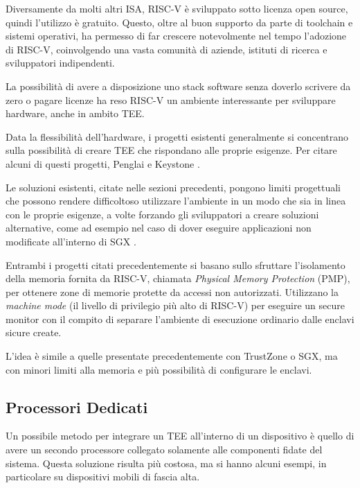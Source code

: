 \documentclass[12pt,italian]{report}
\begin{document}
	Diversamente da molti altri ISA, RISC-V è sviluppato sotto licenza open source, quindi l'utilizzo è gratuito. Questo, oltre al buon supporto da parte di toolchain e sistemi operativi, ha permesso di far crescere notevolmente nel tempo l'adozione di RISC-V, coinvolgendo una vasta comunità di aziende, istituti di ricerca e sviluppatori indipendenti. 
	
	La possibilità di avere a disposizione uno stack software senza doverlo scrivere da zero o pagare licenze ha reso RISC-V un ambiente interessante per sviluppare hardware, anche in ambito TEE.
	
	\bigbreak
	
	Data la flessibilità dell'hardware, i progetti esistenti generalmente si concentrano sulla possibilità di creare TEE che rispondano alle proprie esigenze. Per citare alcuni di questi progetti, Penglai \cite{penglai} e Keystone \cite{keystone}. 
	
	Le soluzioni esistenti, citate nelle sezioni precedenti, pongono limiti progettuali che possono rendere difficoltoso utilizzare l'ambiente in un modo che sia in linea con le proprie esigenze, a volte forzando gli sviluppatori a creare soluzioni alternative, come ad esempio nel caso di dover eseguire applicazioni non modificate all'interno di SGX \cite{grapheneSGX}.
	
	Entrambi i progetti citati precedentemente si basano sullo sfruttare l'isolamento della memoria fornita da RISC-V, chiamata \textit{Physical Memory Protection} (PMP), per ottenere zone di memorie protette da accessi non autorizzati. Utilizzano la \textit{machine mode} (il livello di privilegio più alto di RISC-V) per eseguire un secure monitor con il compito di separare l'ambiente di esecuzione ordinario dalle enclavi sicure create.
	
	L'idea è simile a quelle presentate precedentemente con TrustZone o SGX, ma con minori limiti alla memoria e più possibilità di configurare le enclavi.
	
	\subsection{Processori Dedicati}
	\label{subsec:altri-rpc}
	Un possibile metodo per integrare un TEE all'interno di un dispositivo è quello di avere un secondo processore collegato solamente alle componenti fidate del sistema. Questa soluzione risulta più costosa, ma si hanno alcuni esempi, in particolare su dispositivi mobili di fascia alta.
	
\end{document}
